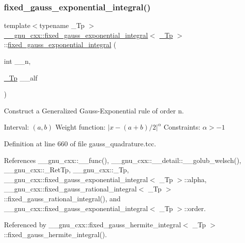 \subsubsection{\texorpdfstring{fixed\+\_\+gauss\+\_\+exponential\+\_\+integral()}{fixed\_gauss\_exponential\_integral()}}
{\footnotesize\ttfamily template$<$typename \+\_\+\+Tp $>$ \\
\hyperlink{struct____gnu__cxx_1_1fixed__gauss__exponential__integral}{\+\_\+\+\_\+gnu\+\_\+cxx\+::fixed\+\_\+gauss\+\_\+exponential\+\_\+integral}$<$ \hyperlink{namespace____gnu__cxx_a3b19a9c800ca194374ef9172290f7d79}{\+\_\+\+Tp} $>$\+::\hyperlink{struct____gnu__cxx_1_1fixed__gauss__exponential__integral}{fixed\+\_\+gauss\+\_\+exponential\+\_\+integral} (\begin{DoxyParamCaption}\item[{int}]{\+\_\+\+\_\+n,  }\item[{\hyperlink{namespace____gnu__cxx_a3b19a9c800ca194374ef9172290f7d79}{\+\_\+\+Tp}}]{\+\_\+\+\_\+alf }\end{DoxyParamCaption})\hspace{0.3cm}{\ttfamily [explicit]}}

Construct a Generalized Gauss-\/\+Exponential rule of order {\ttfamily n}.

Interval\+: $ (a, b) $ Weight function\+: $ |x - (a + b) / 2|^\alpha $ Constraints\+: $ \alpha > -1 $ 

Definition at line 660 of file gauss\+\_\+quadrature.\+tcc.



References \+\_\+\+\_\+gnu\+\_\+cxx\+::\+\_\+\+\_\+func(), \+\_\+\+\_\+gnu\+\_\+cxx\+::\+\_\+\+\_\+detail\+::\+\_\+\+\_\+golub\+\_\+welsch(), \+\_\+\+\_\+gnu\+\_\+cxx\+::\+\_\+\+Ret\+Tp, \+\_\+\+\_\+gnu\+\_\+cxx\+::\+\_\+\+Tp, \+\_\+\+\_\+gnu\+\_\+cxx\+::fixed\+\_\+gauss\+\_\+exponential\+\_\+integral$<$ \+\_\+\+Tp $>$\+::alpha, \+\_\+\+\_\+gnu\+\_\+cxx\+::fixed\+\_\+gauss\+\_\+rational\+\_\+integral$<$ \+\_\+\+Tp $>$\+::fixed\+\_\+gauss\+\_\+rational\+\_\+integral(), and \+\_\+\+\_\+gnu\+\_\+cxx\+::fixed\+\_\+gauss\+\_\+exponential\+\_\+integral$<$ \+\_\+\+Tp $>$\+::order.



Referenced by \+\_\+\+\_\+gnu\+\_\+cxx\+::fixed\+\_\+gauss\+\_\+hermite\+\_\+integral$<$ \+\_\+\+Tp $>$\+::fixed\+\_\+gauss\+\_\+hermite\+\_\+integral().



